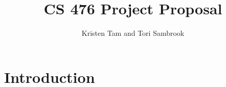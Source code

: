 \documentclass{article}
\title{CS 476 Project Proposal}
\author{Kristen Tam and Tori Sambrook}
\begin{document}
\maketitle

\section*{Introduction} %
\end{document}
